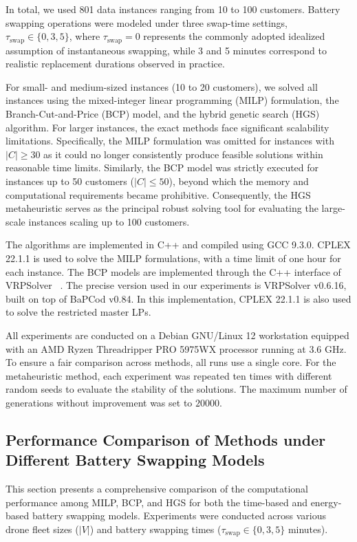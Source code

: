 \documentclass[3p, authoryear, 11pt]{elsarticle}
\begin{document}
In total, we used 801 data instances ranging from 10 to 100 customers.  
Battery swapping operations were modeled under three swap-time settings, $\tau_{\mathrm{swap}} \in \{0, 3, 5\}$, where $\tau_{\mathrm{swap}}=0$ represents the commonly adopted idealized assumption of instantaneous swapping, while 3 and 5 minutes correspond to realistic replacement durations observed in practice.

For small- and medium-sized instances (10 to 20 customers), we solved all instances using the mixed-integer linear programming (MILP) formulation, the Branch-Cut-and-Price (BCP) model, and the hybrid genetic search (HGS) algorithm. For larger instances, the exact methods face significant scalability limitations. Specifically, the MILP formulation was omitted for instances with $|C| \ge 30$ as it could no longer consistently produce feasible solutions within reasonable time limits. Similarly, the BCP model was strictly executed for instances up to 50 customers ($|C| \le 50$), beyond which the memory and computational requirements became prohibitive. Consequently, the HGS metaheuristic serves as the principal robust solving tool for evaluating the large-scale instances scaling up to 100 customers.

The algorithms are implemented in C++ and compiled using GCC 9.3.0. CPLEX 22.1.1 is used to solve the MILP formulations, with a time limit of one hour for each instance. The BCP models are implemented through the C++ interface of VRPSolver ~\citep{pessoa_generic_2020}. The precise version used in our experiments is VRPSolver v0.6.16, built on top of BaPCod v0.84. In this implementation, CPLEX 22.1.1 is also used to solve the restricted master LPs.

All experiments are conducted on a Debian GNU/Linux 12 workstation equipped with an AMD Ryzen Threadripper PRO 5975WX processor running at 3.6 GHz. To ensure a fair comparison across methods, all runs use a single core. For the metaheuristic method, each experiment was repeated ten times with different random seeds to evaluate the stability of the solutions.  
The maximum number of generations without improvement was set to $20000$.

\subsection{Performance Comparison of Methods under Different Battery Swapping Models}
\label{sec:performance_all}

This section presents a comprehensive comparison of the computational performance among MILP, BCP, and HGS for both the time-based and energy-based battery swapping models. Experiments were conducted across various drone fleet sizes ($|V|$) and battery swapping times ($\tau_{\mathrm{swap}} \in \{0, 3, 5\}$ minutes). 
\end{document}
